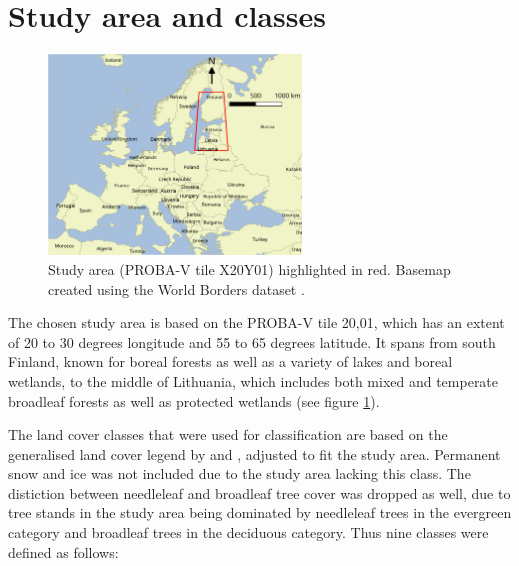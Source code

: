 \documentclass[a4paper,12pt]{scrbook}
\begin{document}
\section{Study area and classes}

\begin{figure}
 \centering
 \includegraphics[width=0.6\textwidth]{./thesis-figures/aoi}
 \caption{Study area (PROBA-V tile X20Y01) highlighted in red. Basemap created using the World Borders dataset \citep{worldborders}.}
 \label{AOI}
\end{figure} 

The chosen study area is based on the PROBA-V tile 20,01, which has an extent of 20 to 30 degrees longitude and 55 to 65 degrees latitude. It spans from south Finland, known for boreal forests as well as a variety of lakes and boreal wetlands, to the middle of Lithuania, which includes both mixed and temperate broadleaf forests as well as protected wetlands (see figure \ref{AOI}).

The land cover classes that were used for classification are based on the generalised land cover legend by \citet{see2015hybrid} and \citet{Herold2008lccomparison}, adjusted to fit the study area. Permanent snow and ice was not included due to the study area lacking this class. The distiction between needleleaf and broadleaf tree cover was dropped as well, due to tree stands in the study area being dominated by needleleaf trees in the evergreen category and broadleaf trees in the deciduous category. Thus nine classes were defined as follows:
\end{document}
